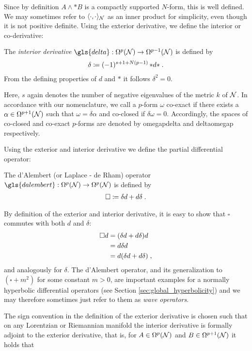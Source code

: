 Since by definition $A \wedge * B$ is a compactly supported $N$-form, this is well defined. We may sometimes refer to $\langle \cdot , \cdot \rangle_{\mathcal{N}}$ as an inner product for simplicity, even though it is not positive definite.
%
%
%
%
%
Using the exterior derivative, we define the interior or co-derivative:
\begin{definition}
	The \emph{interior derivative} $\gls{delta} : \Omega^p(\N) \to \Omega^{p-1}(\N)$ is defined by
	\begin{align}
	\delta \coloneqq (-1)^{s+1+N(p-1)}\, {*{d*}} \;.
	\end{align}
	From the defining properties of $d$ and $*$ it follows $\delta^2 =0$.
\end{definition}
Here, $s$ again denotes the number of negative eigenvalues of the metric $k$ of $\mathcal{N}$. In accordance with our nomenclature, we call a $p$-form $\omega$ co-exact if there exists a $\alpha \in \Omega^{p+1}(\mathcal{N})$ such that $\omega = \delta \alpha$ and co-closed if $\delta \omega = 0$. Accordingly, the spaces of co-closed and co-exact $p$-forms are denoted by \gls{omegapdelta} and \gls{deltaomegap} respectively.\par
Using the exterior and interior derivative we define the partial differential operator:
\begin{definition}
	The d'Alembert (or Laplace - de Rham) operator $\gls{dalembert}: \Omega^p(\N) \to \Omega^{p}(\N)$ is defined by
	\begin{align}
	\square \coloneqq \delta d +d \delta \;.
	\end{align}
\end{definition}
By definition of the exterior and interior derivative, it is easy to show that $\square$ commutes with both $d$ and $\delta$:
\begin{align}
\square d &= (\delta d + d \delta )d \notag \\
&= d \delta d \notag \\
&= d (\delta d + d \delta) \;,
\end{align}
and analogously for $\delta$.
The d'Alembert operator, and its generalization to $(\square + m^2)$ for some constant $m > 0$, are important examples for a normally hyperbolic differential operators (see Section \ref{sec:global_hyperbolicity}) and we may therefore sometimes just refer to them as \emph{wave operators}.\par
The sign convention in the definition of the exterior derivative is chosen such that on any Lorentzian or Riemannian manifold the interior derivative is formally adjoint to the exterior derivative, that is,  for $A \in \Omega^{p}(\mathcal{N})$ and $B \in \Omega^{p+1}(\mathcal{N})$ it holds that

